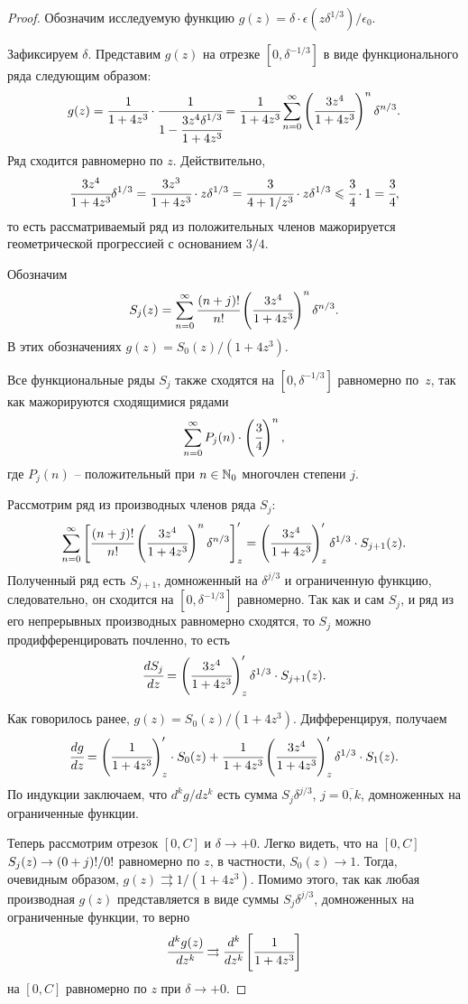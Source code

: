 \begin{proof}

Обозначим исследуемую функцию $g(z) = \delta \cdot \epsilon(z \delta^{1/3}) / \epsilon_0$.

Зафиксируем $\delta$. Представим $g(z)$ на отрезке $[0, \delta^{-1/3}]$ в виде функционального ряда следующим образом:
\[
	g(z) = \cfrac{1}{1 + 4 z^3} \cdot \cfrac{1}{1 - \cfrac{3 z^4 \delta^{1/3}}{1 + 4 z^3}} = \cfrac{1}{1 + 4 z^3} \sum\limits_{n = 0}^\infty \left( \cfrac{3 z^4}{1 + 4 z^3} \right)^n \delta^{n / 3}.
\]
Ряд сходится равномерно по $z$. Действительно,
\[
	\cfrac{3 z^4}{1 + 4 z^3} \delta^{1/3} = \cfrac{3 z^3}{1 + 4 z^3} \cdot z \delta^{1/3} = \cfrac{3}{4 + 1 / z^3} \cdot z \delta^{1/3} \leqslant \cfrac{3}{4} \cdot 1 = \cfrac{3}{4},
\]
то есть рассматриваемый ряд из положительных членов мажорируется геометрической прогрессией с основанием $3/4$.

Обозначим
\[
	S_j(z) = \sum\limits_{n = 0}^\infty \cfrac{(n + j)!}{n!} \left( \cfrac{3 z^4}{1 + 4 z^3} \right)^n \delta^{n / 3}.
\]
В этих обозначениях $g(z) = S_0(z) / (1 + 4 z^3)$.

Все функциональные ряды $S_j$ также сходятся на $[0, \delta^{-1/3}]$ равномерно по~$z$, так как мажорируются сходящимися рядами
\[
	\sum\limits_{n = 0}^\infty P_j(n) \cdot \left( \cfrac{3}{4} \right)^n,
\]
где $P_j(n)$ -- положительный при $n \in {\mathbb{N}}_0$ многочлен степени $j$.

Рассмотрим ряд из производных членов ряда $S_j$:
\[
	\sum\limits_{n = 0}^\infty \left[ \cfrac{(n + j)!}{n!} \left( \cfrac{3 z^4}{1 + 4 z^3} \right)^n \delta^{n / 3} \right]'_z = \left( \cfrac{3 z^4}{1 + 4 z^3} \right)'_z \delta^{1/3} \cdot S_{j + 1}(z).
\]
Полученный ряд есть $S_{j + 1}$, домноженный на $\delta^{j / 3}$ и ограниченную функцию, следовательно, он сходится на $[0, \delta^{-1/3}]$ равномерно. Так как и сам $S_j$, и ряд из его непрерывных производных равномерно сходятся, то $S_j$ можно продифференцировать почленно, то есть
\[
	\cfrac{d S_j}{dz} = \left( \cfrac{3 z^4}{1 + 4 z^3} \right)'_z \delta^{1/3} \cdot S_{j + 1}(z).
\]

Как говорилось ранее, $g(z) = S_0(z) / (1 + 4 z^3)$. Дифференцируя, получаем
\[
	\cfrac{dg}{dz} = \left( \cfrac{1}{1 + 4 z^3} \right)'_z \cdot S_0(z) + \cfrac{1}{1 + 4 z^3} \left( \cfrac{3 z^4}{1 + 4 z^3} \right)'_z \delta^{1/3} \cdot S_1(z).
\]
По индукции заключаем, что $d^k g / d z^k$ есть сумма $S_j \delta^{j / 3}$, $j = \overline{0, k}$, домноженных на ограниченные функции.

Теперь рассмотрим отрезок $[0, C]$ и $\delta \to +0$. Легко видеть, что на $[0, C]$ $S_j(z) \hm \to (0 + j)! / 0!$ равномерно по $z$, в частности, $S_0(z) \to 1$. Тогда, очевидным образом, $g(z) \rightrightarrows 1 / (1 + 4 z^3)$. Помимо этого, так как любая производная $g(z)$ представляется в виде суммы $S_j \delta^{j / 3}$, домноженных на ограниченные функции, то верно
\[
	\cfrac{d^k g(z)}{d z^k} \rightrightarrows \cfrac{d^k}{d z^k} \left[ \cfrac{1}{1 + 4 z^3} \right]
\]
на $[0, C]$ равномерно по $z$ при $\delta \to +0$.

\end{proof}

